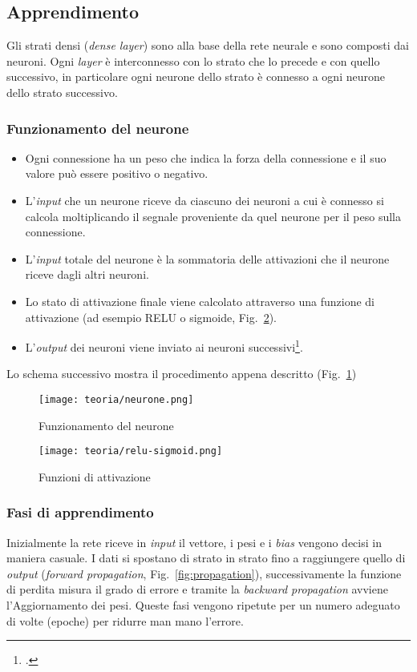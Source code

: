 \subsection{Apprendimento}
Gli strati densi (\emph{dense layer}) sono alla base della rete neurale e sono composti dai neuroni.
Ogni \emph{layer} è interconnesso con lo strato che lo precede e con quello successivo, in particolare ogni neurone dello strato è connesso a ogni neurone dello strato successivo.

\subsubsection{Funzionamento del neurone}

\begin{itemize}
    \item Ogni connessione ha un peso che indica la forza della connessione e il suo valore può essere positivo o negativo.
    \item L'\emph{input} che un neurone riceve da ciascuno dei neuroni a cui è connesso si calcola moltiplicando il segnale proveniente da quel neurone per il peso sulla connessione.
    \item L'\emph{input} totale del neurone è la sommatoria delle attivazioni che il neurone riceve dagli altri neuroni.
    \item Lo stato di attivazione finale viene calcolato attraverso una funzione di attivazione (ad esempio RELU o sigmoide, Fig.~\ref{fig:relu-sigmoid}).
    \item L'\emph{output} dei neuroni viene inviato ai neuroni successivi\footcite{LectureA}.
\end{itemize}
Lo schema successivo mostra il procedimento appena descritto (Fig.~\ref{fig:neurone})

\begin{figure}[!h] 
    \centering 
    \texttt{[image: teoria/neurone.png]} 
    \caption{Funzionamento del neurone}
    \label{fig:neurone}
  \end{figure}

  \begin{figure}[!h] 
    \centering 
    \texttt{[image: teoria/relu-sigmoid.png]} 
    \caption{Funzioni di attivazione}
    \label{fig:relu-sigmoid}
  \end{figure}

\newpage

\subsubsection{Fasi di apprendimento} 
Inizialmente la rete riceve in \emph{input} il vettore, i pesi e i \emph{bias} vengono decisi in maniera casuale.
I dati si spostano di strato in strato fino a raggiungere quello di \emph{output} (\emph{forward propagation}, Fig.~\ref{fig:propagation}), successivamente la funzione di perdita misura il grado di errore e tramite la \emph{backward propagation} avviene l'Aggiornamento dei pesi.
Queste fasi vengono ripetute per un numero adeguato di volte (epoche) per ridurre man mano l'errore.

